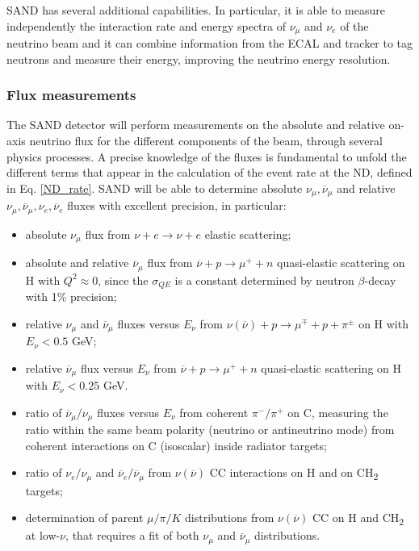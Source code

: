 SAND has several additional capabilities. In particular, it is able to measure independently the interaction rate and energy spectra of $\nu_\mu$ and $\nu_e$ of the neutrino beam and it can combine information from the ECAL and tracker to tag neutrons and measure their energy, improving the neutrino energy resolution.

\subsubsection{Flux measurements}
The SAND detector will perform measurements on the absolute and relative on-axis neutrino flux for the different components of the beam, through several physics processes. A precise knowledge of the fluxes is fundamental to unfold the different terms that appear in the calculation of the event rate at the ND, defined in Eq. \ref{ND_rate}. SAND will be able to determine absolute $\nu_\mu, \overline{\nu}_\mu$ and relative $\nu_\mu, \overline{\nu}_\mu, \nu_e, \overline{\nu}_e$ fluxes with excellent precision, in particular: %
\begin{itemize}
    \item absolute $\nu_\mu$ flux from $\nu + e \rightarrow \nu + e$ elastic scattering;
    \item absolute and relative $\overline{\nu}_\mu$ flux from $\overline{\nu} + p \rightarrow \mu^+ + n$ quasi-elastic scattering on H with $Q^2 \approx 0$, since the $\sigma_{QE}$ is a constant determined by neutron $\beta$-decay with 1\% precision;
    \item relative $\nu_\mu$ and $\overline{\nu}_\mu$ fluxes versus $E_\nu$ from $\nu(\overline{\nu}) + p \rightarrow \mu^\mp + p + \pi^\pm$ on H with $E_{\nu} < 0.5$ GeV;
    \item relative $\overline{\nu}_\mu$ flux versus $E_\nu$ from $\overline{\nu} + p \rightarrow \mu^+ + n$ quasi-elastic scattering on H with $E_{\nu} < 0.25$ GeV.
    \item ratio of $\overline{\nu}_\mu/\nu_\mu$ fluxes versus $E_\nu$ from coherent $\pi^-/\pi^+$ on C, measuring the ratio within the same beam polarity (neutrino or antineutrino mode) from coherent interactions on C (isoscalar) inside radiator targets;
    \item ratio of $\nu_e/\nu_\mu$ and $\overline{\nu}_e/\overline{\nu}_\mu$ from $\nu(\overline{\nu})$ CC interactions on H and on CH\textsubscript{2} targets;
    \item determination of parent $\mu/\pi/K$ distributions from $\nu(\overline{\nu})$ CC on H and CH\textsubscript{2} at low-$\nu$, that requires a fit of both $\nu_\mu$ and $\overline{\nu}_\mu$ distributions.
\end{itemize}

